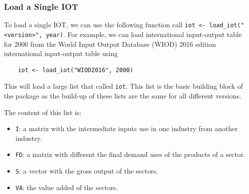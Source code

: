 \documentclass[10pt,a4paper]{paper}
\begin{document}
	\subsubsection{Load a Single IOT}
	\label{subsec:loadsingleiot}
	To load a single IOT, we can use the following function call \texttt{iot <- load\_iot("<version>", year)}.  For example, we can load international input-output table for 2000 from the World Input Output Database (WIOD) 2016 edition international input-output table using
	\begin{Verbatim}
	iot <- load_iot("WIOD2016", 2000)
	\end{Verbatim}
	
	This will load a large list that called \texttt{iot}. This list is the basic building block of the package as the build-up of these lists are the same for all different versions.
	
	The content of this list is:
	\begin{itemize}
		\item \texttt{I}: a matrix with the intermediate inputs use in one industry from another industry.
		\item \texttt{FD}: a matrix with different the final demand uses of the products of a sector. 
		\item \texttt{S}: a vector with the gross output of the sectors.
		\item \texttt{VA}: the value added of the sectors.
	\end{itemize}	
	
\end{document}
